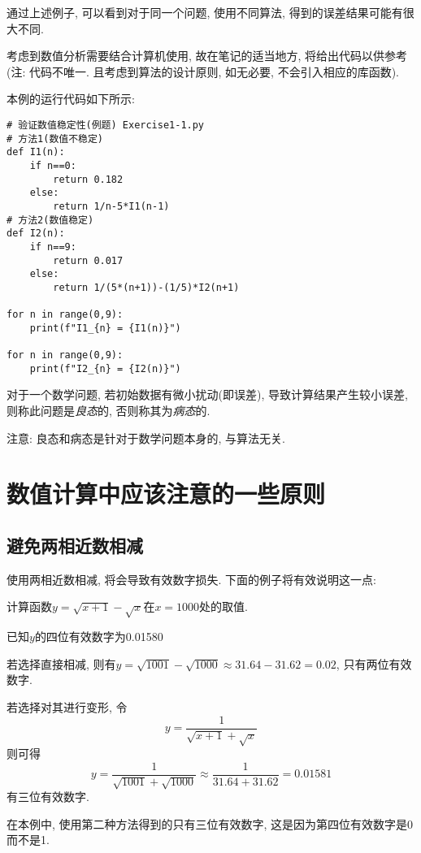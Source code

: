 通过上述例子, 可以看到对于同一个问题, 使用不同算法, 得到的误差结果可能有很大不同.

\begin{extend}
    考虑到数值分析需要结合计算机使用, 故在笔记的适当地方, 将给出代码以供参考(注: 代码不唯一. 且考虑到算法的设计原则, 如无必要, 不会引入相应的库函数). 

    本例的运行代码如下所示:

    \begin{lstlisting}
# 验证数值稳定性(例题) Exercise1-1.py
# 方法1(数值不稳定)
def I1(n):
    if n==0:
        return 0.182
    else:
        return 1/n-5*I1(n-1)
# 方法2(数值稳定)  
def I2(n):
    if n==9:
        return 0.017
    else:
        return 1/(5*(n+1))-(1/5)*I2(n+1)

for n in range(0,9):
    print(f"I1_{n} = {I1(n)}")

for n in range(0,9):
    print(f"I2_{n} = {I2(n)}")
    \end{lstlisting}
\end{extend}

\begin{definition}[良态与病态]
    对于一个数学问题, 若初始数据有微小扰动(即误差), 导致计算结果产生较小误差, 则称此问题是\emph{良态}的, 否则称其为\emph{病态}的.
\end{definition}

注意: 良态和病态是针对于数学问题本身的, 与算法无关. 

\section{数值计算中应该注意的一些原则}

\subsection{避免两相近数相减}

使用两相近数相减, 将会导致有效数字损失. 下面的例子将有效说明这一点:

\begin{example}
    计算函数$y=\sqrt{x+1}-\sqrt{x}$在$x=1000$处的取值.

    已知$y$的四位有效数字为0.01580
\end{example}

\begin{solution}
    若选择直接相减, 则有$y=\sqrt{1001}-\sqrt{1000}\approx31.64-31.62=0.02$, 只有两位有效数字.

    若选择对其进行变形, 令
    \begin{equation*}
        y=\frac{1}{\sqrt{x+1}+\sqrt{x}}
    \end{equation*}
    则可得
    \begin{equation*}
        y = \frac{1}{\sqrt{1001}+\sqrt{1000}}\approx\frac{1}{31.64+31.62}=0.01581
    \end{equation*}
    有三位有效数字.
\end{solution}

\begin{notice}
    在本例中, 使用第二种方法得到的只有三位有效数字, 这是因为第四位有效数字是0而不是1.
\end{notice}